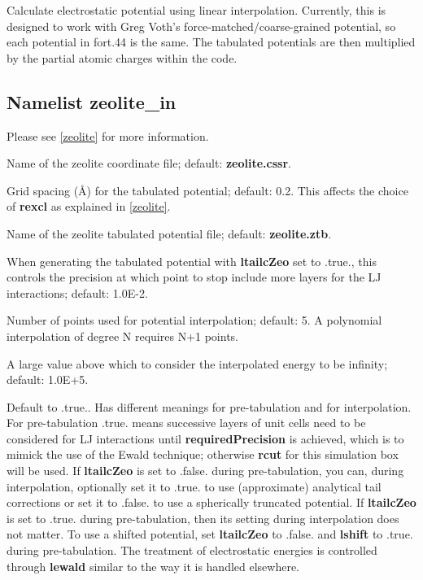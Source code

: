 \documentclass[12pt,letterpaper]{article}
\begin{document}
 Calculate electrostatic
potential using linear interpolation. Currently, this is
designed to work with Greg Voth's
force-matched/coarse-grained potential, so each potential in
fort.44 is the same. The tabulated potentials are then
multiplied by the partial atomic charges within the code.

\subsection{Namelist \textbf{zeolite\_in}}
\label{zeolite_in}
Please see \ref{zeolite} for more information.

 Name of the zeolite
coordinate file; default: \textbf{zeolite.cssr}.

 Grid spacing (\AA) for the tabulated
potential; default: 0.2. This affects the choice of
\textbf{rexcl} as explained in \ref{zeolite}.

 Name of the zeolite tabulated
potential file; default: \textbf{zeolite.ztb}.

 When generating the
tabulated potential with \textbf{ltailcZeo} set to .true.,
this controls the precision at which point to stop include
more layers for the LJ interactions; default: 1.0E-2.

 Number of points
used for potential interpolation; default: 5. A polynomial
interpolation of degree N requires N+1 points.

 A large value above which to
consider the interpolated energy to be infinity; default:
1.0E+5.

 Default to .true.. Has different
meanings for pre-tabulation and for interpolation. For
pre-tabulation .true. means successive layers of unit cells
need to be considered for LJ interactions until
\textbf{requiredPrecision} is achieved, which is to mimick
the use of the Ewald technique; otherwise \textbf{rcut} for
this simulation box will be used. If \textbf{ltailcZeo} is
set to .false. during pre-tabulation, you can, during
interpolation, optionally set it to .true. to use
(approximate) analytical tail corrections or set it to
.false. to use a spherically truncated potential. If
\textbf{ltailcZeo} is set to .true. during pre-tabulation,
then its setting during interpolation does not matter. To
use a shifted potential, set \textbf{ltailcZeo} to .false.
and \textbf{lshift} to .true. during pre-tabulation. The
treatment of electrostatic energies is controlled through
\textbf{lewald} similar to the way it is handled elsewhere.
\end{document}
